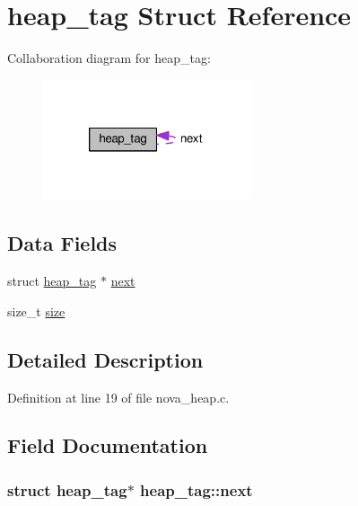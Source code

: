 \hypertarget{structheap__tag}{\section{heap\-\_\-tag Struct Reference}
\label{structheap__tag}
}


Collaboration diagram for heap\-\_\-tag\-:
\nopagebreak
\begin{figure}[H]
\begin{center}
\leavevmode
\includegraphics[width=175pt]{structheap__tag__coll__graph}
\end{center}
\end{figure}
\subsection*{Data Fields}
\begin{DoxyCompactItemize}
\item 
struct \hyperlink{structheap__tag}{heap\-\_\-tag} $\ast$ \hyperlink{structheap__tag_ae0e42d810512a9636393bab081921a7c}{next}
\item 
size\-\_\-t \hyperlink{structheap__tag_aa492677962c3d48df0880c9dacea3564}{size}
\end{DoxyCompactItemize}


\subsection{Detailed Description}


Definition at line 19 of file nova\-\_\-heap.\-c.



\subsection{Field Documentation}
\hypertarget{structheap__tag_ae0e42d810512a9636393bab081921a7c}{
\subsubsection[{next}]{\setlength{\rightskip}{0pt plus 5cm}struct {\bf heap\-\_\-tag}$\ast$ heap\-\_\-tag\-::next}}\label{structheap__tag_ae0e42d810512a9636393bab081921a7c}


